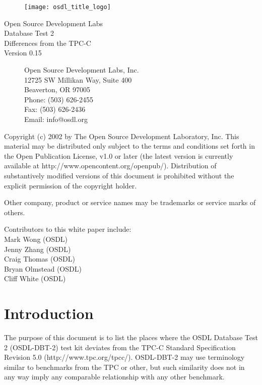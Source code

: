 \documentclass{article}
\begin{document}
\begin{titlepage}

\begin{figure}[t]
\centering
\texttt{[image: osdl\_title\_logo]}
\end{figure}

\centering
\huge
Open Source Development Labs \\
Database Test 2 \\
\Huge
Differences from the TPC-C \\
\LARGE
Version 0.15

\begin{figure}[b]
\flushleft
\normalsize
Open Source Development Labs, Inc.\\
12725 SW Millikan Way, Suite 400\\
Beaverton, OR 97005\\
Phone: (503) 626-2455\\
Fax: (503) 626-2436\\
Email: info@osdl.org
\end{figure}

\end{titlepage}

Copyright (c) 2002 by The Open Source Development Laboratory, Inc. This
material may be distributed only subject to the terms and conditions set forth
in the Open Publication License, v1.0 or later (the latest version is currently
available at http://www.opencontent.org/openpub/). Distribution of
substantively modified versions of this document is prohibited without the
explicit permission of the copyright holder.

Other company, product or service names may be trademarks or service marks of
others.

Contributors to this white paper include: \\
Mark Wong (OSDL) \\
Jenny Zhang (OSDL) \\
Craig Thomas (OSDL) \\
Bryan Olmstead (OSDL) \\
Cliff White (OSDL) \\

\pagebreak

\section{Introduction}

The purpose of this document is to list the places where the OSDL Database
Test 2 (OSDL-DBT-2) test kit deviates from the TPC-C Standard Specification
Revision 5.0 (http://www.tpc.org/tpcc/).  OSDL-DBT-2 may use terminology
similar to benchmarks from the TPC or other, but such similarity does not in
any way imply any comparable relationship with any other benchmark.
\end{document}
